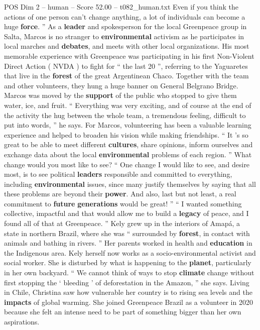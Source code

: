 \begin{textsample}{POS Dim 2 – human – Score 52.00 – t082\_human.txt}
Even if you think the actions of one person can't change anything, a lot of individuals can become a huge \textbf{force}. ” As a \textbf{leader} and spokesperson for the local Greenpeace group in Salta, Marcos is no stranger to \textbf{environmental} activism as he participates in local marches and \textbf{debates}, and meets with other local organizations.
His most memorable experience with Greenpeace was participating in his first Non-Violent Direct Action ( NVDA ) to fight for “ the last 20 ”, referring to the Yaguaretes that live in the \textbf{forest} of the great Argentinean Chaco.
Together with the team and other volunteers, they hung a huge banner on General Belgrano Bridge.
Marcos was moved by the \textbf{support} of the public who stopped to give them water, ice, and fruit. “ Everything was very exciting, and of course at the end of the activity the hug between the whole team, a tremendous feeling, difficult to put into words, ” he says.
For Marcos, volunteering has been a valuable learning experience and helped to broaden his vision while making friendships. “ It ’s so great to be able to meet different \textbf{cultures}, share opinions, inform ourselves and exchange data about the local \textbf{environmental} problems of each region. ” What change would you most like to see? “ One change I would like to see, and desire most, is to see political \textbf{leaders} responsible and committed to everything, including \textbf{environmental} issues, since many justify themselves by saying that all these problems are beyond their \textbf{power}.
And also, last but not least, a real commitment to \textbf{future} \textbf{generations} would be great! ” “ I wanted something collective, impactful and that would allow me to build a \textbf{legacy} of peace, and I found all of that at Greenpeace. ” Kely grew up in the interiors of Amapá, a state in northern Brazil, where she was “ surrounded by \textbf{forest}, in contact with animals and bathing in rivers. ” Her parents worked in health and \textbf{education} in the Indigenous area.
Kely herself now works as a socio-environmental activist and social worker.
She is disturbed by what is happening to the \textbf{planet}, particularly in her own backyard. “ We cannot think of ways to stop \textbf{climate} change without first stopping the ‘ bleeding ’ of deforestation in the Amazon, ” she says.
Living in Chile, Christina saw how vulnerable her country is to rising sea levels and the \textbf{impacts} of global warming.
She joined Greenpeace Brazil as a volunteer in 2020 because she felt an intense need to be part of something bigger than her own aspirations.

\end{textsample}
